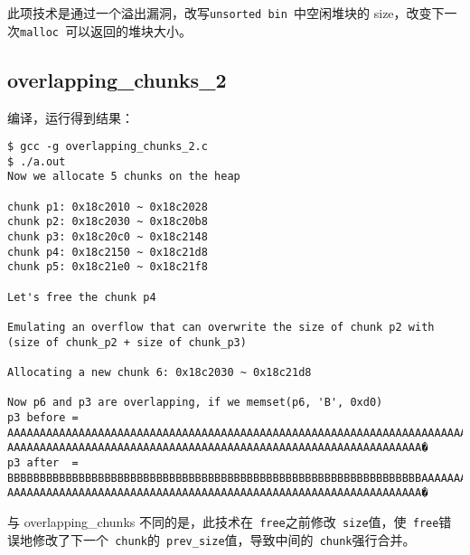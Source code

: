 此项技术是通过一个溢出漏洞，改写\verb+unsorted bin +中空闲堆块的 size，改变下一次\verb+malloc +可以返回的堆块大小。

\subsection{overlapping\_chunks\_2}

编译，运行得到结果：
\begin{verbatim}
$ gcc -g overlapping_chunks_2.c
$ ./a.out 
Now we allocate 5 chunks on the heap

chunk p1: 0x18c2010 ~ 0x18c2028
chunk p2: 0x18c2030 ~ 0x18c20b8
chunk p3: 0x18c20c0 ~ 0x18c2148
chunk p4: 0x18c2150 ~ 0x18c21d8
chunk p5: 0x18c21e0 ~ 0x18c21f8

Let's free the chunk p4

Emulating an overflow that can overwrite the size of chunk p2 with (size of chunk_p2 + size of chunk_p3)

Allocating a new chunk 6: 0x18c2030 ~ 0x18c21d8

Now p6 and p3 are overlapping, if we memset(p6, 'B', 0xd0)
p3 before = AAAAAAAAAAAAAAAAAAAAAAAAAAAAAAAAAAAAAAAAAAAAAAAAAAAAAAAAAAAAAAAAAAAAAAAA
AAAAAAAAAAAAAAAAAAAAAAAAAAAAAAAAAAAAAAAAAAAAAAAAAAAAAAAAAAAAAAAA�
p3 after  = BBBBBBBBBBBBBBBBBBBBBBBBBBBBBBBBBBBBBBBBBBBBBBBBBBBBBBBBBBBBBBBBAAAAAAAA
AAAAAAAAAAAAAAAAAAAAAAAAAAAAAAAAAAAAAAAAAAAAAAAAAAAAAAAAAAAAAAAA�
\end{verbatim}

与 overlapping\_chunks 不同的是，此技术在\verb+ free+之前修改\verb+ size+值，使\verb+ free+错误地修改了下一个\verb+ chunk+的\verb+ prev_size+值，导致中间的\verb+ chunk+强行合并。
\newpage
